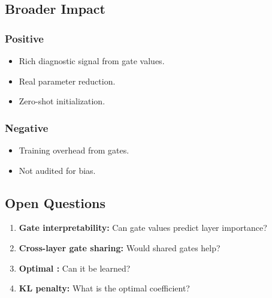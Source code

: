 \subsection{Broader Impact}

\subsubsection{Positive}
\begin{itemize}
\item Rich diagnostic signal from gate values.
\item Real parameter reduction.
\item Zero-shot initialization.

\end{itemize}
\subsubsection{Negative}
\begin{itemize}
\item Training overhead from gates.
\item Not audited for bias.

\end{itemize}
\subsection{Open Questions}

\begin{enumerate}
\item \textbf{Gate interpretability:} Can gate values predict layer importance?
\item \textbf{Cross-layer gate sharing:} Would shared gates help?
\item \textbf{Optimal  :} Can it be learned?
\item \textbf{KL penalty:} What is the optimal coefficient?

\end{enumerate}
